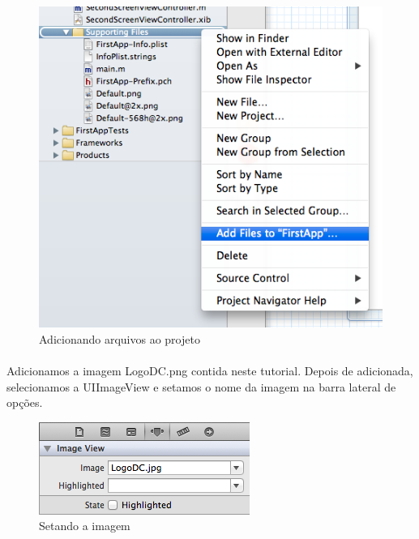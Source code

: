 \documentclass[a4paper,12pt,brazil,doubleside]{book}
\begin{document}
\begin{figure}[h]
  \centering
  \includegraphics[totalheight=0.25\textheight]{../figuras/ios/2/add_files.png}
  \caption{Adicionando arquivos ao projeto}
  \label{fig:a}
\end{figure}

\bigskip

\paragraph{}Adicionamos a imagem LogoDC.png contida neste tutorial. Depois de adicionada, selecionamos a UIImageView e setamos o nome da imagem na barra lateral de opções.

\begin{figure}[h]
  \centering
  \includegraphics[totalheight=0.1\textheight]{../figuras/ios/2/image_path.png}
  \caption{Setando a imagem}
  \label{fig:a}
\end{figure}
\end{document}
